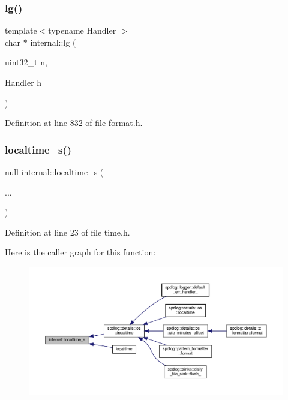 \subsubsection{\texorpdfstring{lg()}{lg()}}
{\footnotesize\ttfamily template$<$typename Handler $>$ \\
char $\ast$ internal\+::lg (\begin{DoxyParamCaption}\item[{uint32\+\_\+t}]{n,  }\item[{Handler}]{h }\end{DoxyParamCaption})\hspace{0.3cm}{\ttfamily [inline]}}



Definition at line 832 of file format.\+h.

\mbox{\label{namespaceinternal_a990db8ce6eb1702f344b5993587f37af}} 
\subsubsection{\texorpdfstring{localtime\+\_\+s()}{localtime\_s()}}
{\footnotesize\ttfamily \hyperlink{structinternal_1_1null}{null} internal\+::localtime\+\_\+s (\begin{DoxyParamCaption}\item[{}]{... }\end{DoxyParamCaption})\hspace{0.3cm}{\ttfamily [inline]}}



Definition at line 23 of file time.\+h.

Here is the caller graph for this function\+:
\nopagebreak
\begin{figure}[H]
\begin{center}
\leavevmode
\includegraphics[width=350pt]{namespaceinternal_a990db8ce6eb1702f344b5993587f37af_icgraph}
\end{center}
\end{figure}
\mbox{\label{namespaceinternal_ac3d17a309d86929584064104267b6de4}} 
